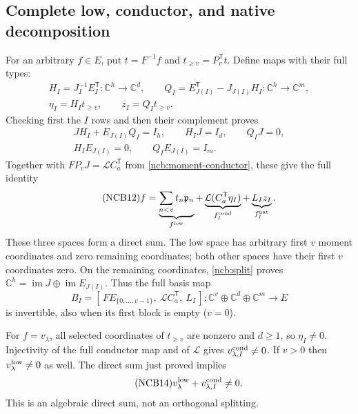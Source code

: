 \subsection{Complete low, conductor, and native decomposition}
For an arbitrary $f\in E$, put $t=F^{-1}f$ and
$t_{\geq v}=P_v^{\mathsf T}t$. Define maps with their full types:
\begin{equation}\tag{NCB10}\label{ncb:HQ}
\begin{gathered}
H_I=J_I^{-1}E_I^{\mathsf T}:\mathbb C^h\to\mathbb C^d,\qquad
Q_I=E_{J(I)}^{\mathsf T}-J_{J(I)}H_I:
       \mathbb C^h\to\mathbb C^m,\\
\eta_I=H_It_{\geq v},\qquad z_I=Q_It_{\geq v}.
\end{gathered}
\end{equation}
Checking first the $I$ rows and then their complement proves
\begin{equation}\tag{NCB11}\label{ncb:split}
\begin{gathered}
JH_I+E_{J(I)}Q_I=I_h,\qquad H_IJ=I_d,\qquad Q_IJ=0,\\
H_IE_{J(I)}=0,\qquad Q_IE_{J(I)}=I_m.
\end{gathered}
\end{equation}
Together with $FP_vJ=\mathcal LC_a^{\mathsf T}$ from
\eqref{ncb:moment-conductor}, these give the full identity
\begin{equation}\tag{NCB12}\label{ncb:decomposition}
f=\underbrace{\sum_{n<v}t_n\mathfrak p_n}_{f^{\rm low}}
 +\underbrace{\mathcal L(C_a^{\mathsf T}\eta_I)}_{f_I^{\rm cond}}
 +\underbrace{L_Iz_I}_{f_I^{\rm nat}} .
\end{equation}
These three spaces form a direct sum. The low space has arbitrary
first $v$ moment coordinates and zero remaining coordinates; both
other spaces have their first $v$ coordinates zero. On the remaining
coordinates, \eqref{ncb:split} proves
$\mathbb C^h=\operatorname{im}J\oplus\operatorname{im}E_{J(I)}$.
Thus the full basis map
\begin{equation}\tag{NCB13}\label{ncb:full-chart}
B_I=[\,FE_{\{0,\ldots,v-1\}},\ \mathcal LC_a^{\mathsf T},\ L_I\,]:
\mathbb C^v\oplus\mathbb C^d\oplus\mathbb C^m\longrightarrow E
\end{equation}
is invertible, also when its first block is empty ($v=0$).

For $f=v_\lambda$, all selected coordinates of $t_{\geq v}$ are
nonzero and $d\geq1$, so $\eta_I\ne0$. Injectivity of the full
conductor map and of $\mathcal L$ gives
$v_{\lambda,I}^{\rm cond}\ne0$. If $v>0$ then
$v_\lambda^{\rm low}\ne0$ as well. The direct sum just proved implies
\begin{equation}\tag{NCB14}\label{ncb:nonzero}
v_\lambda^{\rm low}+v_{\lambda,I}^{\rm cond}\ne0 .
\end{equation}
This is an algebraic direct sum, not an orthogonal splitting.

